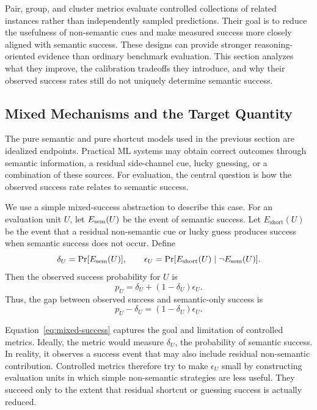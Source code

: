 \documentclass[acmsmall,screen,review,anonymous]{acmart}
\begin{document}
Pair, group, and cluster metrics evaluate controlled collections of related
instances rather than independently sampled predictions. Their goal is to
reduce the usefulness of non-semantic cues and make measured success more
closely aligned with semantic success. These designs can provide stronger
reasoning-oriented evidence than ordinary benchmark evaluation. This section
analyzes what they improve, the calibration tradeoffs they introduce, and why
their observed success rates still do not uniquely determine semantic
success.

\subsection{Mixed Mechanisms and the Target Quantity}
\label{sec:controlled-metrics:mixed}

The pure semantic and pure shortcut models used in the previous section are
idealized endpoints. Practical ML systems may obtain correct outcomes through
semantic information, a residual side-channel cue, lucky guessing, or a
combination of these sources. For evaluation, the central question is how the
observed success rate relates to semantic success.

We use a simple mixed-success abstraction to describe this case. For an
evaluation unit \(U\), let \(E_{\mathrm{sem}}(U)\) be the event of semantic
success. Let \(E_{\mathrm{short}}(U)\) be the event that a residual
non-semantic cue or lucky guess produces success when semantic success does
not occur. Define
\[
\delta_U
=
\Pr[E_{\mathrm{sem}}(U)],
\qquad
\epsilon_U
=
\Pr[E_{\mathrm{short}}(U)\mid \neg E_{\mathrm{sem}}(U)].
\]
Then the observed success probability for \(U\) is
\begin{equation}
\label{eq:mixed-success}
p_U
=
\delta_U+(1-\delta_U)\epsilon_U.
\end{equation}
Thus, the gap between observed success and semantic-only success is
\[
p_U-\delta_U
=
(1-\delta_U)\epsilon_U.
\]

Equation~\eqref{eq:mixed-success} captures the goal and limitation of
controlled metrics. Ideally, the metric would measure \(\delta_U\), the
probability of semantic success. In reality, it observes a success event that
may also include residual non-semantic contribution. Controlled metrics
therefore try to make \(\epsilon_U\) small by constructing evaluation units
in which simple non-semantic strategies are less useful. They succeed only to
the extent that residual shortcut or guessing success is actually reduced.
\end{document}
